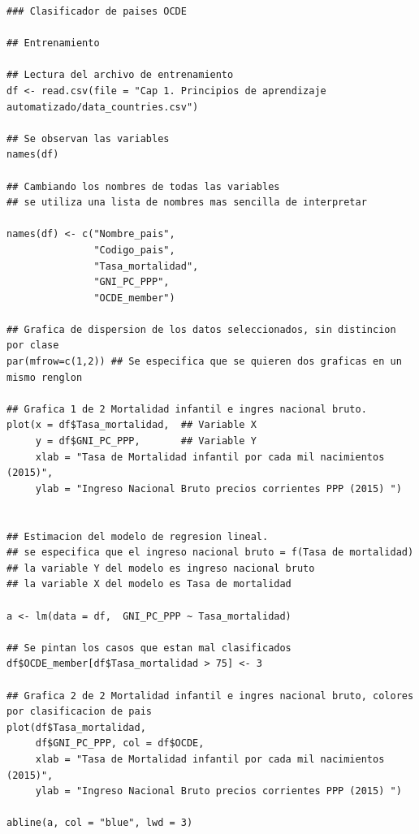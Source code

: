 \documentclass[letterpaper,12pt, spanish, oneside]{book} %
\begin{document}
\begin{lstlisting}
### Clasificador de paises OCDE

## Entrenamiento

## Lectura del archivo de entrenamiento
df <- read.csv(file = "Cap 1. Principios de aprendizaje automatizado/data_countries.csv")

## Se observan las variables
names(df)

## Cambiando los nombres de todas las variables
## se utiliza una lista de nombres mas sencilla de interpretar

names(df) <- c("Nombre_pais",
               "Codigo_pais",
               "Tasa_mortalidad",
               "GNI_PC_PPP",
               "OCDE_member")

## Grafica de dispersion de los datos seleccionados, sin distincion por clase
par(mfrow=c(1,2)) ## Se especifica que se quieren dos graficas en un mismo renglon

## Grafica 1 de 2 Mortalidad infantil e ingres nacional bruto.
plot(x = df$Tasa_mortalidad,  ## Variable X
     y = df$GNI_PC_PPP,       ## Variable Y
     xlab = "Tasa de Mortalidad infantil por cada mil nacimientos (2015)",
     ylab = "Ingreso Nacional Bruto precios corrientes PPP (2015) ")


## Estimacion del modelo de regresion lineal.
## se especifica que el ingreso nacional bruto = f(Tasa de mortalidad)
## la variable Y del modelo es ingreso nacional bruto
## la variable X del modelo es Tasa de mortalidad

a <- lm(data = df,  GNI_PC_PPP ~ Tasa_mortalidad)

## Se pintan los casos que estan mal clasificados
df$OCDE_member[df$Tasa_mortalidad > 75] <- 3

## Grafica 2 de 2 Mortalidad infantil e ingres nacional bruto, colores por clasificacion de pais
plot(df$Tasa_mortalidad,
     df$GNI_PC_PPP, col = df$OCDE,
     xlab = "Tasa de Mortalidad infantil por cada mil nacimientos (2015)",
     ylab = "Ingreso Nacional Bruto precios corrientes PPP (2015) ")

abline(a, col = "blue", lwd = 3)
\end{lstlisting}
\end{document}
